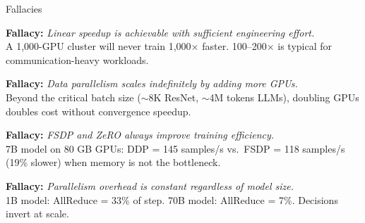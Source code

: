 \documentclass[aspectratio=169, 12pt]{beamer}
\begin{document}
\begin{frame}{Fallacies}

\footnotesize
\textbf{Fallacy:} \textit{Linear speedup is achievable with sufficient engineering effort.}\\
A 1,000-GPU cluster will never train 1,000$\times$ faster. 100--200$\times$ is typical for communication-heavy workloads.

\vspace{0.08cm}
\textbf{Fallacy:} \textit{Data parallelism scales indefinitely by adding more GPUs.}\\
Beyond the critical batch size ($\sim$8K ResNet, $\sim$4M tokens LLMs), doubling GPUs doubles cost without convergence speedup.

\vspace{0.08cm}
\textbf{Fallacy:} \textit{FSDP and ZeRO always improve training efficiency.}\\
7B model on 80 GB GPUs: DDP = 145 samples/s vs.\ FSDP = 118 samples/s (19\% slower) when memory is not the bottleneck.

\vspace{0.08cm}
\textbf{Fallacy:} \textit{Parallelism overhead is constant regardless of model size.}\\
1B model: AllReduce = 33\% of step. 70B model: AllReduce = 7\%. Decisions invert at scale.

\end{frame}
\end{document}
